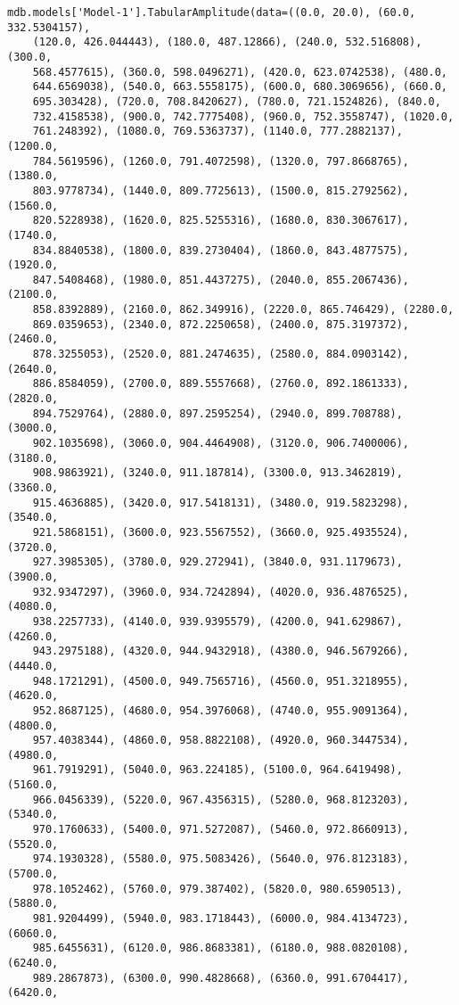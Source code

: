 \documentclass[12pt, letterpaper, oneside]{report}
\begin{document}
\begin{lstlisting}[frame=none]
mdb.models['Model-1'].TabularAmplitude(data=((0.0, 20.0), (60.0, 332.5304157), 
    (120.0, 426.044443), (180.0, 487.12866), (240.0, 532.516808), (300.0, 
    568.4577615), (360.0, 598.0496271), (420.0, 623.0742538), (480.0, 
    644.6569038), (540.0, 663.5558175), (600.0, 680.3069656), (660.0, 
    695.303428), (720.0, 708.8420627), (780.0, 721.1524826), (840.0, 
    732.4158538), (900.0, 742.7775408), (960.0, 752.3558747), (1020.0, 
    761.248392), (1080.0, 769.5363737), (1140.0, 777.2882137), (1200.0, 
    784.5619596), (1260.0, 791.4072598), (1320.0, 797.8668765), (1380.0, 
    803.9778734), (1440.0, 809.7725613), (1500.0, 815.2792562), (1560.0, 
    820.5228938), (1620.0, 825.5255316), (1680.0, 830.3067617), (1740.0, 
    834.8840538), (1800.0, 839.2730404), (1860.0, 843.4877575), (1920.0, 
    847.5408468), (1980.0, 851.4437275), (2040.0, 855.2067436), (2100.0, 
    858.8392889), (2160.0, 862.349916), (2220.0, 865.746429), (2280.0, 
    869.0359653), (2340.0, 872.2250658), (2400.0, 875.3197372), (2460.0, 
    878.3255053), (2520.0, 881.2474635), (2580.0, 884.0903142), (2640.0, 
    886.8584059), (2700.0, 889.5557668), (2760.0, 892.1861333), (2820.0, 
    894.7529764), (2880.0, 897.2595254), (2940.0, 899.708788), (3000.0, 
    902.1035698), (3060.0, 904.4464908), (3120.0, 906.7400006), (3180.0, 
    908.9863921), (3240.0, 911.187814), (3300.0, 913.3462819), (3360.0, 
    915.4636885), (3420.0, 917.5418131), (3480.0, 919.5823298), (3540.0, 
    921.5868151), (3600.0, 923.5567552), (3660.0, 925.4935524), (3720.0, 
    927.3985305), (3780.0, 929.272941), (3840.0, 931.1179673), (3900.0, 
    932.9347297), (3960.0, 934.7242894), (4020.0, 936.4876525), (4080.0, 
    938.2257733), (4140.0, 939.9395579), (4200.0, 941.629867), (4260.0, 
    943.2975188), (4320.0, 944.9432918), (4380.0, 946.5679266), (4440.0, 
    948.1721291), (4500.0, 949.7565716), (4560.0, 951.3218955), (4620.0, 
    952.8687125), (4680.0, 954.3976068), (4740.0, 955.9091364), (4800.0, 
    957.4038344), (4860.0, 958.8822108), (4920.0, 960.3447534), (4980.0, 
    961.7919291), (5040.0, 963.224185), (5100.0, 964.6419498), (5160.0, 
    966.0456339), (5220.0, 967.4356315), (5280.0, 968.8123203), (5340.0, 
    970.1760633), (5400.0, 971.5272087), (5460.0, 972.8660913), (5520.0, 
    974.1930328), (5580.0, 975.5083426), (5640.0, 976.8123183), (5700.0, 
    978.1052462), (5760.0, 979.387402), (5820.0, 980.6590513), (5880.0, 
    981.9204499), (5940.0, 983.1718443), (6000.0, 984.4134723), (6060.0, 
    985.6455631), (6120.0, 986.8683381), (6180.0, 988.0820108), (6240.0, 
    989.2867873), (6300.0, 990.4828668), (6360.0, 991.6704417), (6420.0, 

\end{lstlisting}
\end{document}
